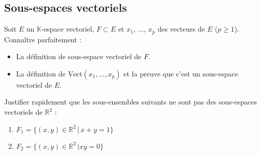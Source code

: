 \documentclass[a4paper,twoside,french,11pt]{VcCours}
\begin{document}
\subsection{Sous-espaces vectoriels}

\begin{ptc}{}
	Soit $E$ un $\mathbb{K}$-espace vectoriel, $F \subset E$ et $x_1$, $\ldots$, $x_p$ des vecteurs de $E$ ($p \geq 1$). Connaître parfaitement :
\begin{itemize}
\item La définition de sous-espace vectoriel de $F$.
\item La définition de $\textrm{Vect}(x_1, \ldots, x_p)$ et la preuve que c'est un sous-espace vectoriel de $E$.
\end{itemize}
\end{ptc}

%
%
%
%
%
%
%
%

\begin{Exercice}{}
  Justifier rapidement que les sous-ensembles suivants ne sont pas des sous-espaces vectoriels de $\mathbb{R}^2$ :
  
  \begin{enumerate}
    \item $F_1 = \lbrace (x,y) \in \mathbb{R}^2 \, \vert \, x+y=1 \rbrace $
    \item $F_2 = \lbrace (x,y) \in \mathbb{R}^2 \, \vert xy=0 \rbrace $
  \end{enumerate}
\end{Exercice} 
\end{document}
